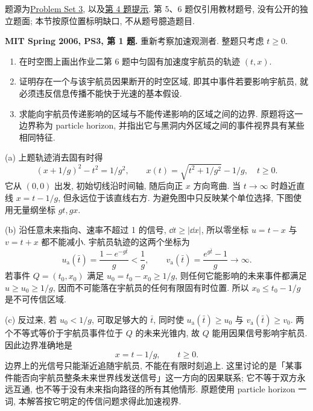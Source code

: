 
题源为\href{https://ocw.mit.edu/courses/8-962-general-relativity-spring-2020/resources/mit8_962s20_pset03/}{Problem Set 3}, 以及\href{https://ocw.mit.edu/courses/8-962-general-relativity-spring-2020/resources/mit8_962s20_pset03_hint/}{第 4 题提示}. 第 5、6 题仅引用教材题号, 没有公开的独立题面; 本节按原位置标明缺口, 不从题号臆造题目.

\begin{exercise}
\textbf{MIT Spring 2006, PS3, 第 1 题.} 重新考察加速观测者. 整题只考虑 $t\ge0$.
\begin{enumerate}[label=(\alph*)]
\item 在时空图上画出作业二第 6 题中匀固有加速度宇航员的轨迹 $(t,x)$.
\item 证明存在一个与该宇航员因果断开的时空区域, 即其中事件若要影响宇航员, 就必须违反信息传播不能快于光速的基本假设.
\item 求能向宇航员传递影响的区域与不能传递影响的区域之间的边界. 原题将这一边界称为 particle horizon, 并指出它与黑洞内外区域之间的事件视界具有某些相同特征.
\end{enumerate}
\end{exercise}
\begin{solution}
(a) 上题轨迹消去固有时得
\[
 (x+1/g)^2-t^2=1/g^2,\qquad
 x(t)=\sqrt{t^2+1/g^2}-1/g,\quad t\ge0.
\]
它从 $(0,0)$ 出发, 初始切线沿时间轴, 随后向正 $x$ 方向弯曲. 当 $t\to\infty$ 时趋近直线 $x=t-1/g$, 但永远位于该直线右方. 为避免图中只反映某个单位选择, 下图使用无量纲坐标 $gt,gx$.
\begin{center}
\end{center}

(b) 沿任意未来指向、速率不超过 1 的信号, $\dd t\ge|\dd x|$, 所以零坐标 $u=t-x$ 与 $v=t+x$ 都不能减小. 宇航员轨迹的这两个坐标为
\[
 u_{\mathrm{a}}(\bar t)=\frac{1-e^{-g\bar t}}g<\frac1g,
 \qquad
 v_{\mathrm{a}}(\bar t)=\frac{e^{g\bar t}-1}g\longrightarrow\infty.
\]
若事件 $Q=(t_0,x_0)$ 满足 $u_0=t_0-x_0\ge1/g$, 则任何它能影响的未来事件都满足 $u\ge u_0\ge1/g$, 因而不可能落在宇航员的任何有限固有时位置. 所以 $x_0\le t_0-1/g$ 是不可传信区域.

(c) 反过来, 若 $u_0<1/g$, 可取足够大的 $\bar t$, 同时使 $u_{\mathrm a}(\bar t)\ge u_0$ 与 $v_{\mathrm a}(\bar t)\ge v_0$. 两个不等式等价于宇航员事件位于 $Q$ 的未来光锥内, 故 $Q$ 能用因果信号影响宇航员. 因此边界准确地是
\[
 x=t-1/g,\qquad t\ge0.
\]
边界上的光信号只能渐近追随宇航员, 不能在有限时刻追上. 这里讨论的是「某事件能否向宇航员整条未来世界线发送信号」这一方向的因果联系; 它不等于双方永远互通, 也不等于没有未来指向路径的所有其他情形. 原题使用 particle horizon 一词, 本解答按它明定的传信问题求得此加速视界.
\end{solution}

